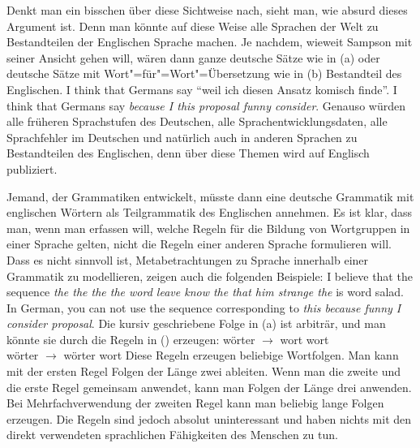 Denkt man ein bisschen über diese Sichtweise nach, sieht man, wie absurd dieses Argument ist. Denn
man könnte auf diese Weise alle Sprachen der Welt zu Bestandteilen der Englischen Sprache machen.
Je nachdem, wieweit Sampson mit seiner Ansicht gehen will, wären dann \zb ganze deutsche Sätze wie in (a)
oder deutsche Sätze mit Wort"=für"=Wort"=Übersetzung wie in (b) Bestandteil des Englischen.
\eal
\ex I think that Germans say "`weil ich diesen Ansatz komisch finde"'.
\ex I think that Germans say \emph{because I this proposal funny consider}.
\zl
Genauso würden alle früheren Sprachstufen des Deutschen, alle Sprachentwicklungsdaten,
alle Sprachfehler im Deutschen und natürlich auch in anderen Sprachen zu Bestandteilen des
Englischen, denn über diese Themen wird auf Englisch publiziert.

Jemand, der Grammatiken entwickelt, müsste dann eine deutsche Grammatik mit englischen Wörtern
als Teilgrammatik des Englischen annehmen. Es ist klar, dass man, wenn man erfassen will, welche
Regeln für die Bildung von Wortgruppen in einer Sprache gelten, nicht die Regeln einer anderen
Sprache formulieren will. Dass es nicht sinnvoll ist, Metabetrachtungen zu Sprache innerhalb
einer Grammatik zu modellieren, zeigen auch die folgenden Beispiele:
\eal
\ex I believe that the sequence \emph{the the the the word leave know the that him strange the} is word salad.
\ex In German, you can not use the sequence corresponding to \emph{this because funny I consider proposal}.
\zl
Die kursiv geschriebene Folge in (a) ist arbiträr, und man könnte sie durch die Regeln in () erzeugen:
\ea
wörter $\to$ wort wort\\
wörter $\to$ wörter wort
\z
Diese Regeln erzeugen beliebige Wortfolgen. Man kann mit der ersten Regel Folgen der Länge zwei
ableiten. Wenn man die zweite und die erste Regel gemeinsam anwendet, kann man Folgen der Länge drei
anwenden. Bei Mehrfachverwendung der zweiten Regel kann man beliebig lange Folgen erzeugen.
Die Regeln sind jedoch absolut uninteressant und 
haben nichts mit den direkt verwendeten sprachlichen Fähigkeiten des Menschen zu tun.

